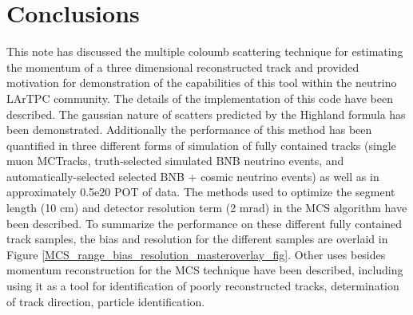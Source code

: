 \section{Conclusions}\label{conclusion_section}

This note has discussed the multiple coloumb scattering technique for estimating the momentum of a three dimensional reconstructed track and provided motivation for demonstration of the capabilities of this tool within the neutrino LArTPC community. The details of the implementation of this code have been described. The gaussian nature of scatters predicted by the Highland formula has been demonstrated. Additionally the performance of this method has been quantified in three different forms of simulation of fully contained tracks (single muon {\sc MCTracks}, truth-selected simulated BNB neutrino events, and automatically-selected selected BNB + cosmic neutrino events) as well as in approximately 0.5e20 POT of {\ub} data. The methods used to optimize the segment length (10 cm) and detector resolution term (2 mrad) in the MCS algorithm have been described. To summarize the performance on these different fully contained track samples, the bias and resolution for the different samples are overlaid in Figure \ref{MCS_range_bias_resolution_masteroverlay_fig}. Other uses besides momentum reconstruction for the MCS technique have been described, including using it as a tool for identification of poorly reconstructed tracks, determination of track direction, particle identification. 


